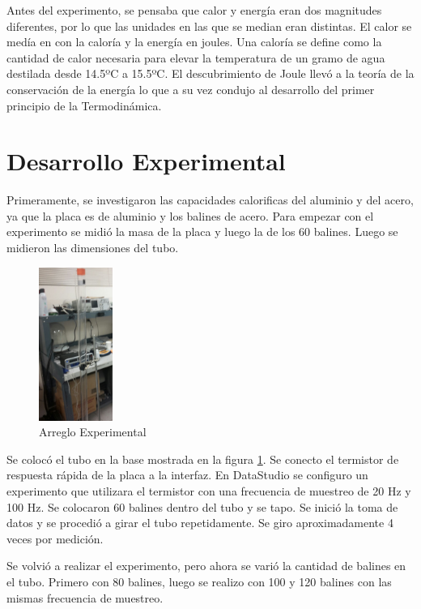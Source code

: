\documentclass[12pt]{article}
\begin{document}
\hspace{0.5cm}Antes del experimento, se pensaba que calor y energía eran dos magnitudes diferentes, por lo que las unidades en las que se median eran distintas. El calor se medía en con la caloría y la energía en joules. Una caloría se define como la cantidad de calor necesaria para elevar la temperatura de un gramo de agua destilada desde 14.5ºC a 15.5ºC. El descubrimiento de Joule llevó a la teoría de la conservación de la energía lo que a su vez condujo al desarrollo del primer principio de la Termodinámica.\vspace{-0.5cm}
\section{Desarrollo Experimental}\vspace{-0.5cm}
Primeramente, se investigaron las capacidades calorificas del aluminio y del acero, ya que la placa es de aluminio y los balines de acero. Para empezar con el experimento se midió la masa de la placa y luego la de los 60 balines. Luego se midieron las dimensiones del tubo.

\begin{figure}[H]
\centering
\includegraphics[width=0.25\linewidth ,height=5cm]{Arreglo.png}
\caption{Arreglo Experimental}
\label{fig:Arreglo}
\end{figure}

Se colocó el tubo en la base mostrada en la figura \ref{fig:Arreglo}. Se conecto el termistor de respuesta rápida de la placa a la interfaz.  En DataStudio se configuro un experimento que utilizara el termistor con una frecuencia de muestreo de 20 Hz y 100 Hz. Se colocaron 60 balines dentro del tubo y se tapo. Se inició la toma de datos y se procedió a girar el tubo repetidamente. Se giro aproximadamente 4 veces por medición. 

Se volvió a realizar el experimento, pero ahora se varió la cantidad de balines en el tubo. Primero  con 80 balines, luego se realizo con 100 y 120 balines con las mismas frecuencia de muestreo.
\end{document}
